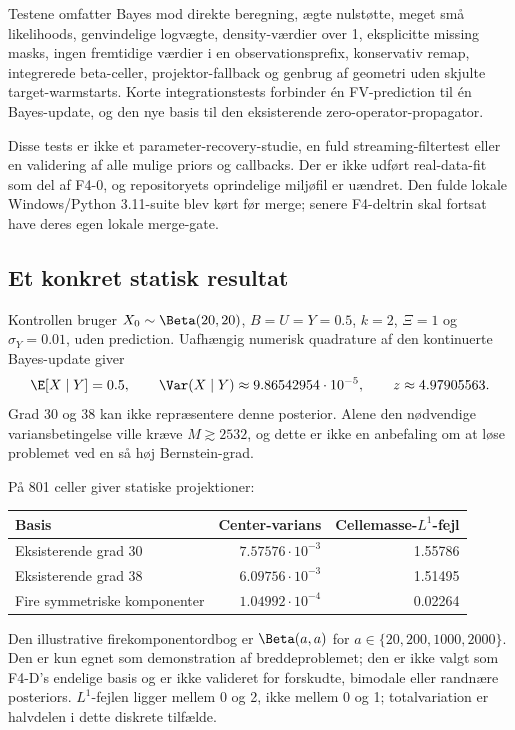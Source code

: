 Testene omfatter Bayes mod direkte beregning, ægte nulstøtte, meget små likelihoods, genvindelige logvægte, density-værdier over 1, eksplicitte missing masks, ingen fremtidige værdier i en observationsprefix, konservativ remap, integrerede beta-celler, projektor-fallback og genbrug af geometri uden skjulte target-warmstarts. Korte integrationstests forbinder én FV-prediction til én Bayes-update, og den nye basis til den eksisterende zero-operator-propagator.

Disse tests er ikke et parameter-recovery-studie, en fuld streaming-filtertest eller en validering af alle mulige priors og callbacks. Der er ikke udført real-data-fit som del af F4-0, og repositoryets oprindelige miljøfil er uændret. Den fulde lokale Windows/Python 3.11-suite blev kørt før merge; senere F4-deltrin skal fortsat have deres egen lokale merge-gate.

\subsection{Et konkret statisk resultat}
Kontrollen bruger \(X_0\sim\Beta(20,20)\), \(B=U=Y=0.5\), \(k=2\), \(\Xi=1\) og \(\sigma_Y=0.01\), uden prediction. Uafhængig numerisk quadrature af den kontinuerte Bayes-update giver
\begin{equation}
 \E[X\mid Y]=0.5,\qquad
 \Var(X\mid Y)\approx9.86542954\cdot10^{-5},\qquad z\approx4.97905563.
 \label{eq:preparationresult}
\end{equation}
Grad 30 og 38 kan ikke repræsentere denne posterior. Alene den nødvendige variansbetingelse ville kræve \(M\gtrsim2532\), og dette er ikke en anbefaling om at løse problemet ved en så høj Bernstein-grad.

På 801 celler giver statiske projektioner:
\begin{center}
\begin{tabular}{@{}lrr@{}}
\toprule
Basis & Center-varians & Cellemasse-\(L^1\)-fejl\\\midrule
Eksisterende grad 30 & \(7.57576\cdot10^{-3}\) & 1.55786\\
Eksisterende grad 38 & \(6.09756\cdot10^{-3}\) & 1.51495\\
Fire symmetriske komponenter & \(1.04992\cdot10^{-4}\) & 0.02264\\\bottomrule
\end{tabular}
\end{center}
Den illustrative firekomponentordbog er \(\Beta(a,a)\) for \(a\in\{20,200,1000,2000\}\). Den er kun egnet som demonstration af breddeproblemet; den er ikke valgt som F4-D's endelige basis og er ikke valideret for forskudte, bimodale eller randnære posteriors. \(L^1\)-fejlen ligger mellem 0 og 2, ikke mellem 0 og 1; totalvariation er halvdelen i dette diskrete tilfælde.

